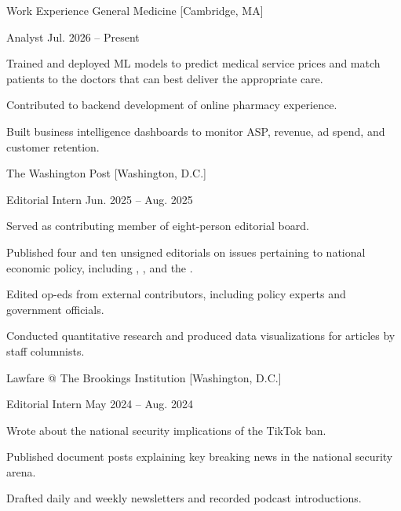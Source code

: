 \documentclass[11pt,a4paper]{article}
\begin{document}
\SectionHeader
    {Work Experience}
\Entry
    {General Medicine}
    [Cambridge, MA]
    {
        \Position
            {Analyst}
            {Jul. 2026 -- Present}
            {
                \item Trained and deployed ML models to predict medical service prices and match patients to the doctors that can best deliver the appropriate care.
                \item Contributed to backend development of online pharmacy experience.
                \item Built business intelligence dashboards to monitor ASP, revenue, ad spend, and customer retention.
            }
    }
\Entry
    {The Washington Post}
    [Washington, D.C.]
    {
        \Position
            {Editorial Intern}
            {Jun. 2025 -- Aug. 2025}
            {
                \item Served as contributing member of eight-person editorial board.
                \item Published four  and ten unsigned editorials on issues pertaining to national economic policy, including , , and the .
                \item Edited op-eds from external contributors, including policy experts and government officials.
                \item Conducted quantitative research and produced data visualizations for articles by staff columnists.
            }
    }
\Entry
    {Lawfare @ The Brookings Institution}
    [Washington, D.C.]
    {
        \Position
            {Editorial Intern}
            {May 2024 -- Aug. 2024}
            {
                \item Wrote  about the national security implications of the TikTok ban.
                \item Published document posts explaining key breaking news in the national security arena.
                \item Drafted daily and weekly newsletters and recorded podcast introductions.
            }
    }
\end{document}
